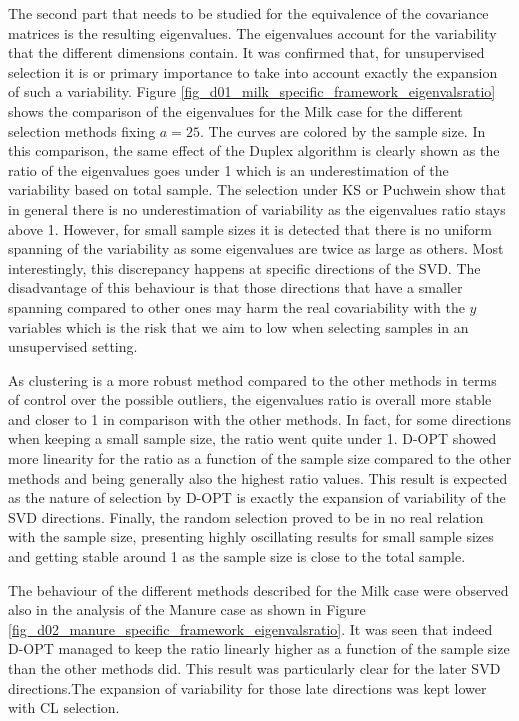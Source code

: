 \documentclass[journal=ancham,manuscript=article]{achemso}
\begin{document}
The second part that needs to be studied for the equivalence of the covariance matrices is the resulting eigenvalues. The eigenvalues account for the variability that the different dimensions contain. It was confirmed that, for unsupervised selection it is or primary importance to take into account exactly the expansion of such a variability. Figure \ref{fig_d01_milk_specific_framework_eigenvalsratio} shows the comparison of the eigenvalues for the Milk case for the different selection methods fixing $a=25$. The curves are colored by the sample size. In this comparison, the same effect of the Duplex algorithm is clearly shown as the ratio of the eigenvalues goes under 1 which is an underestimation of the variability based on total sample.  The selection under KS or Puchwein show that in general there is no underestimation of variability as the eigenvalues ratio stays above 1. However, for small sample sizes it is detected that there is no uniform spanning of the variability as some eigenvalues are twice as large as others. Most interestingly, this discrepancy happens at specific directions of the SVD. The disadvantage of this behaviour is that those directions that have a smaller spanning compared to other ones may harm the real covariability with the $y$ variables which is the risk that we aim to low when selecting samples in an unsupervised setting. 

As clustering is a more robust method compared to the other methods in terms of control over the possible outliers, the eigenvalues ratio is overall more stable and closer to 1 in comparison with the other methods. In fact, for some directions when keeping a small sample size, the ratio went quite under 1. D-OPT showed more linearity for the ratio as a function of the sample size compared to the other methods and being generally also the highest ratio values. This result is expected as the nature of selection by D-OPT is exactly the expansion of variability of the SVD directions.  Finally, the random selection proved to be in no real relation with the sample size, presenting highly oscillating results for small sample sizes and getting stable around 1 as the sample size is close to the total sample. 

The behaviour of the different methods described for the Milk case were observed also in the analysis of the Manure case as shown in Figure \ref{fig_d02_manure_specific_framework_eigenvalsratio}. It was seen that indeed D-OPT managed to keep the ratio linearly higher as a function of the sample size than the other methods did. This result was particularly clear for the later SVD directions.The expansion of variability for those late directions was kept lower with CL selection.  
\end{document}
